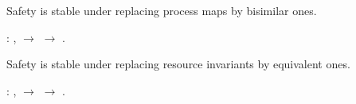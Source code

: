 \documentclass[12pt]{report}
\begin{document}
Safety is stable under replacing process maps by bisimilar ones. \begin{coqdoccode}
\coqdocemptyline
\coqdocnoindent
{}  :\coqdoceol
\coqdocindent{1.00em}
\coqdockw{\ensuremath{\forall}}          ,\coqdoceol
\coqdocindent{1.00em}
   \ensuremath{\rightarrow}\coqdoceol
\coqdocindent{1.00em}
          \ensuremath{\rightarrow}\coqdoceol
\coqdocindent{1.00em}
         .\coqdoceol
\coqdocemptyline
\end{coqdoccode}
Safety is stable under replacing resource invariants
    by equivalent ones. \begin{coqdoccode}
\coqdocemptyline
\coqdocnoindent
{}  :\coqdoceol
\coqdocindent{1.00em}
\coqdockw{\ensuremath{\forall}}          ,\coqdoceol
\coqdocindent{1.00em}
   \ensuremath{\rightarrow}\coqdoceol
\coqdocindent{1.00em}
          \ensuremath{\rightarrow}\coqdoceol
\coqdocindent{1.00em}
         .\coqdoceol
\coqdocemptyline
\end{coqdoccode}
\end{document}
